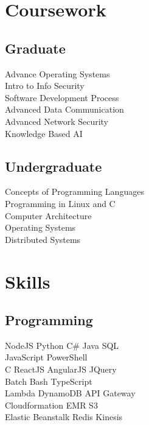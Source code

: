 \documentclass[]{deedy-resume-openfont}
\begin{document}
\begin{minipage}[t]{0.33\textwidth}

\section{Coursework}
\subsection{Graduate}
Advance Operating Systems \\
Intro to Info Security \\
Software Development Process \\
Advanced Data Communication \\
Advanced Network Security \\
Knowledge Based AI
\sectionsep
\subsection{Undergraduate}
Concepts of Programming Languages \\
Programming in Linux and C \\
Computer Architecture \\
Operating Systems \\
Distributed Systems
\sectionsep


\section{Skills}
\subsection{Programming}

NodeJS \textbullet{} Python \textbullet{} C\# \textbullet{} Java \textbullet{} SQL \\
JavaScript \textbullet{} PowerShell \\

C \textbullet{} ReactJS \textbullet{} AngularJS \textbullet{} JQuery \\
Batch \textbullet{} Bash \textbullet{} TypeScript \\

Lambda \textbullet{} DynamoDB \textbullet{} API Gateway  \\
Cloudformation \textbullet{} EMR \textbullet{} S3 \\
Elastic Beanstalk \textbullet{} Redis \textbullet{} Kinesis \\


\end{minipage}
\end{document}
